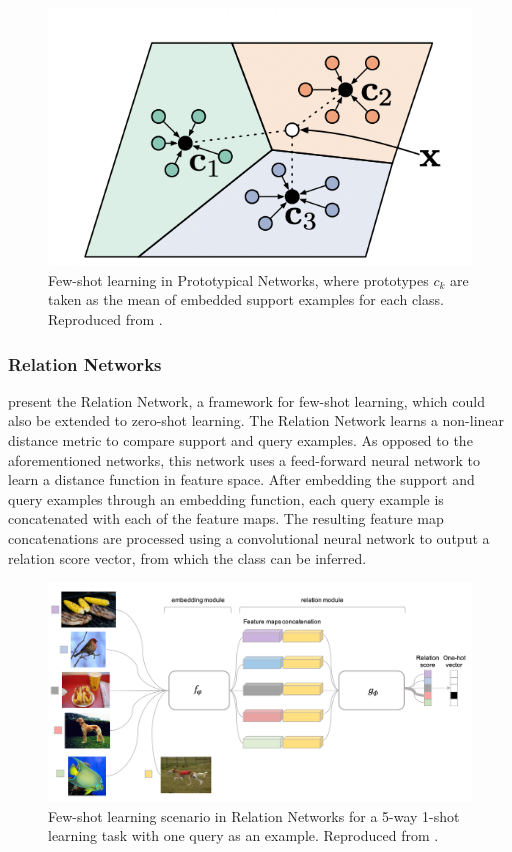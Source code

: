\begin{figure}[h]
	\centering
	\includegraphics[width=0.7\linewidth]{img/protonets.png}
	\caption{Few-shot learning in Prototypical Networks, where prototypes \textbf{$c_k$} are taken as the mean of embedded support examples for each class. Reproduced from \citet{snell2017prototypical}.}
	\label{fig:protonets}
\end{figure}

\subsubsection{Relation Networks}

\citet{sung2018learning} present the Relation Network, a framework for few-shot learning, which could also be extended to zero-shot learning. The Relation Network learns a non-linear distance metric to compare support and query examples. As opposed to the aforementioned networks, this network uses a feed-forward neural network to learn a distance function in feature space. After embedding the support and query examples through an embedding function, each query example is concatenated with each of the feature maps. The resulting feature map concatenations are processed using a convolutional neural network to output a relation score vector, from which the class can be inferred.

\begin{figure}[h]
	\centering
	\includegraphics[width=0.9\linewidth]{img/relation-nets.png}
	\caption[Relation Networks]{Few-shot learning scenario in Relation Networks for a 5-way 1-shot learning task with one query as an example. Reproduced from \citet{sung2018learning}.}
	\label{fig:relationnets}
\end{figure}

